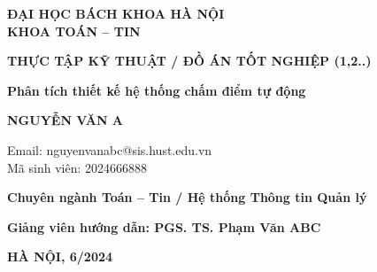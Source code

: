 \documentclass[12pt,a4paper]{report}
\makeatletter
\newcommand{\tenDeTai}{Phân tích thiết kế hệ thống chấm điểm tự động}
\newcommand{\tenSinhVien}{NGUYỄN VĂN A}
\newcommand{\emailSinhVien}{nguyenvanabc@sis.hust.edu.vn}
\newcommand{\maSinhVien}{2024666888}
\newcommand{\chuyenNganh}{Toán -- Tin / Hệ thống Thông tin Quản lý}
\newcommand{\tenGVHD}{PGS. TS. Phạm Văn ABC}
\newcommand{\thangNam}{6/2024}
\newcommand{\loaiBaoCao}{THỰC TẬP KỸ THUẬT / ĐỒ ÁN TỐT NGHIỆP (1,2..)}
\makeatother
\begin{document}
\newpage

\begin{center}

    \vspace*{1cm}

    {\fontsize{14}{18}\selectfont\bfseries ĐẠI HỌC BÁCH KHOA HÀ NỘI}\\[4pt]
    {\fontsize{14}{18}\selectfont\bfseries KHOA TOÁN -- TIN}

    \vspace{5cm}

    {\fontsize{18}{22}\selectfont\bfseries \loaiBaoCao}

    \vspace{1.5cm}

    {\fontsize{14}{18}\selectfont\bfseries \tenDeTai}

    \vspace{1cm}

    {\fontsize{14}{18}\selectfont\bfseries \tenSinhVien}

    \vspace{0.6cm}

    {\fontsize{14}{18}\selectfont Email: \emailSinhVien}\\[4pt]
    {\fontsize{14}{18}\selectfont Mã sinh viên: \maSinhVien}

    \vspace{0.6cm}

    {\fontsize{14}{18}\selectfont\bfseries Chuyên ngành \chuyenNganh}

    \vfill

    \begin{flushleft}
        \hspace{2cm}
        \begin{minipage}{0.6\textwidth}
            {\fontsize{13}{16}\selectfont\bfseries Giảng viên hướng dẫn: \tenGVHD}\\[8pt]
        \end{minipage}
    \end{flushleft}

    \vspace{1.5cm}

    {\fontsize{13}{16}\selectfont\bfseries HÀ NỘI, \thangNam}

\end{center}
\end{document}
